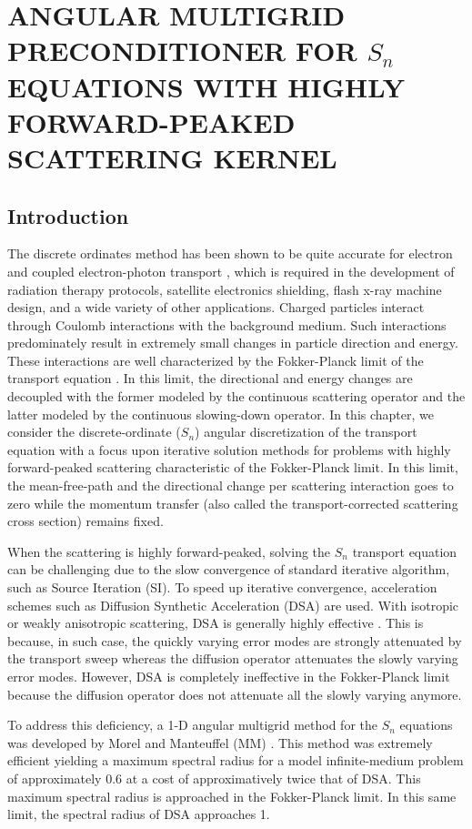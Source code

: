 \chapter{\uppercase{Angular Multigrid Preconditioner for $S_n$ equations with Highly
Forward-Peaked Scattering Kernel}}
\section{Introduction}
The discrete ordinates method has been shown to be quite accurate for electron
and coupled electron-photon transport \cite{morel_81,accuracy_1,accuracy_2}, 
which is required in the development of radiation therapy protocols, satellite 
electronics shielding, flash x-ray machine design, and a wide variety of other 
applications. Charged particles interact through Coulomb interactions with the 
background medium. Such interactions predominately result in extremely small changes 
in particle direction and energy. These interactions are well characterized by the
Fokker-Planck limit of the transport equation \cite{fp_limit,morel_96}. In this 
limit, the directional and energy changes are decoupled with the former modeled 
by the continuous scattering operator and the latter modeled by the continuous 
slowing-down operator. In this chapter, we consider the discrete-ordinate ($S_n$) 
angular discretization of the transport equation with a focus upon iterative 
solution methods for problems with highly forward-peaked scattering characteristic 
of the Fokker-Planck limit. In this limit, the mean-free-path and the directional 
change per scattering interaction goes to zero while the momentum transfer 
(also called the transport-corrected scattering cross section) remains fixed.

When the scattering is highly forward-peaked, solving the $S_n$ transport
equation can be challenging due to the slow convergence of standard iterative
algorithm, such as Source Iteration (SI). To speed up iterative convergence,
acceleration schemes such as Diffusion Synthetic Acceleration (DSA) are used.
With isotropic or weakly anisotropic scattering, DSA is generally highly
effective \cite{dsa_ref}. This is because, in such case, the quickly varying
error modes are strongly attenuated by the transport sweep whereas the
diffusion operator attenuates the slowly varying error modes. However, DSA is
completely ineffective in the Fokker-Planck limit \cite{multigrid_1d} because
the diffusion operator does not attenuate all the slowly varying anymore.

To address this deficiency, a 1-D angular multigrid method for the $S_n$
equations was developed by Morel and Manteuffel (MM) \cite{multigrid_1d}. This
method was extremely efficient yielding a maximum spectral radius for 
a model infinite-medium problem of approximately 0.6 at a cost of
approximatively twice that of DSA. This maximum spectral radius is approached
in the Fokker-Planck limit. In this same limit, the spectral radius of DSA
approaches 1. 

